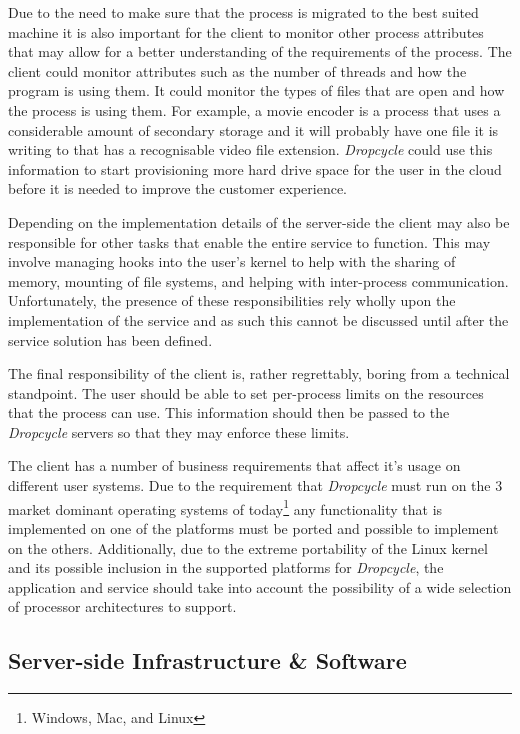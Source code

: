 \documentclass[12pt, a4paper]{article}
\begin{document}
Due to the need to make sure that the process is migrated to the best suited
machine it is also important for the client to monitor other process attributes
that may allow for a better understanding of the requirements of the process.
The client could monitor attributes such as the number of threads and how the
program is using them. It could monitor the types of files that are open and
how the process is using them. For example, a movie encoder is a process that
uses a considerable amount of secondary storage and it will probably have one
file it is writing to that has a recognisable video file extension.
\emph{Dropcycle} could use this information to start provisioning more hard
drive space for the user in the cloud before it is needed to improve the
customer experience.

Depending on the implementation details of the server-side the client may also
be responsible for other tasks that enable the entire service to function. This
may involve managing hooks into the user's kernel to help with the sharing of
memory, mounting of file systems, and helping with inter-process communication.
Unfortunately, the presence of these responsibilities rely wholly upon the
implementation of the service and as such this cannot be discussed until after
the service solution has been defined.

The final responsibility of the client is, rather regrettably, boring from
a technical standpoint. The user should be able to set per-process limits on
the resources that the process can use. This information should then be passed
to the \emph{Dropcycle} servers so that they may enforce these limits.

The client has a number of business requirements that affect it's usage on
different user systems. Due to the requirement that \emph{Dropcycle} must run
on the 3 market dominant operating systems of today\footnote{Windows, Mac, and
Linux} any functionality that is implemented on one of the platforms must be
ported and possible to implement on the others. Additionally, due to the
extreme portability of the Linux kernel and its possible inclusion in the
supported platforms for \emph{Dropcycle}, the application and service should
take into account the possibility of a wide selection of processor
architectures to support.

\subsection{Server-side Infrastructure \& Software}
\end{document}
